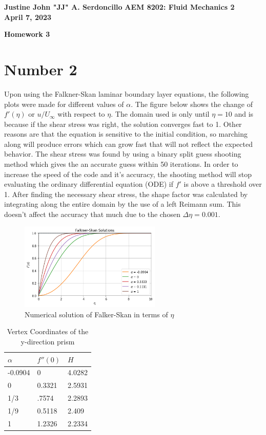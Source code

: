 \documentclass{article}
\begin{document}
	
	\noindent\textbf{Justine John "JJ" A. Serdoncillo}
	\hfill \textbf{AEM 8202: Fluid Mechanics 2} \\ \hfill \textbf{April 7, 2023}
	
	\begin{center}
		\Large{\textbf{Homework 3}}    
	\end{center}
	
	\section*{Number 2}
	
	Upon using the Falkner-Skan laminar boundary layer equations, the following plots were made for different values of $\alpha$. The figure below shows the change of $f'(\eta)$ or $u/U_{\infty}$ with respect to $\eta$. The domain used is only until $\eta = 10$ and is because if the shear stress was right, the solution converges fast to 1. Other reasons are that the  equation is sensitive to the initial condition, so marching along will produce errors which can grow fast that will not reflect the expected behavior. The shear stress was found by using a binary split guess shooting method which gives the an accurate guess within 50 iterations. In order to increase the speed of the code and it's accuracy, the shooting method will stop evaluating the ordinary differential equation (ODE) if $f'$ is above a threshold over 1. After finding the necessary shear stress, the shape factor was calculated by integrating along the entire domain by the use of a left Reimann sum. This doesn't affect the accuracy that much due to the chosen $\Delta \eta = 0.001$.
		
		\begin{figure}[H]
			\centering
			\includegraphics[width=0.6\textwidth]{images/etaOne.png}
			\caption{ Numerical solution of Falker-Skan in terms of $\eta$ }
		\end{figure}
		
		\begin{table}[h!]
			\centering
			\begin{tabular}{l l l} 
				\hline \hline
				$\alpha$ & $f''(0)$ & $H$ \\ 
				\hline
				-0.0904 & 0 & 4.0282 \\ 
				0 & 0.3321 & 2.5931 \\
				1/3 & .7574 & 2.2893 \\
				1/9 & 0.5118 & 2.409 \\
				1  & 1.2326 & 2.2334 \\
				\hline \hline
				\end{tabular}
				\caption{Vertex Coordinates of the y-direction prism}
		\end{table}
		
\end{document}
